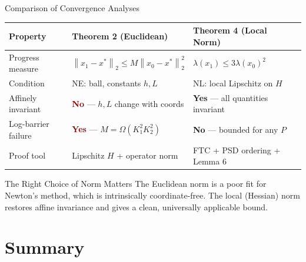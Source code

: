 \documentclass[aspectratio=169,10pt]{beamer}
\newcommand{\norm}[1]{\left\|#1\right\|}
\begin{document}
\begin{frame}{Comparison of Convergence Analyses}
  \begin{center}
  \renewcommand{\arraystretch}{1.4}
  \begin{tabular}{lll}
    \toprule
    \textbf{Property} & \textbf{Theorem 2 (Euclidean)} & \textbf{Theorem 4 (Local Norm)} \\
    \midrule
    Progress measure
      & $\norm{x_1-x^*}_2 \le M\norm{x_0-x^*}_2^2$
      & $\lambda(x_1)\le 3\lambda(x_0)^2$ \\[2pt]
    Condition
      & NE: ball, constants $h,L$
      & NL: local Lipschitz on $H$ \\[2pt]
    Affinely invariant
      & \textcolor{darkred}{\textbf{No}} — $h,L$ change with coords
      & \textcolor{green2}{\textbf{Yes}} — all quantities invariant \\[2pt]
    Log-barrier failure
      & \textcolor{darkred}{\textbf{Yes}} — $M=\Omega(K_1^2K_2^2)$
      & \textcolor{green2}{\textbf{No}} — bounded for any $P$ \\[2pt]
    Proof tool
      & Lipschitz $H$ + operator norm
      & FTC + PSD ordering + Lemma 6 \\
    \bottomrule
  \end{tabular}
  \end{center}

  \vspace{0.8em}
  \begin{alertblock}{The Right Choice of Norm Matters}
    The Euclidean norm is a poor fit for Newton's method, which is
    intrinsically coordinate-free. The local (Hessian) norm restores
    affine invariance and gives a clean, universally applicable bound.
  \end{alertblock}
\end{frame}

\section{Summary}
\end{document}
